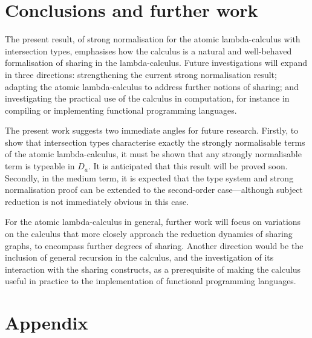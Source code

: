 \documentclass[orivec]{llncs}
\begin{document}
\section{Conclusions and further work}



The present result, of strong normalisation for the atomic lambda-calculus with intersection types, emphasises how the calculus is a natural and well-behaved formalisation of sharing in the lambda-calculus.
%
Future investigations will expand in three directions: strengthening the current strong normalisation result; adapting the atomic lambda-calculus to address further notions of sharing; and investigating the practical use of the calculus in computation, for instance in compiling or implementing functional programming languages.



The present work suggests two immediate angles for future research.
%
Firstly, to show that intersection types characterise exactly the strongly normalisable terms of the atomic lambda-calculus, it must be shown that any strongly normalisable term is typeable in $D_a$.
%
It is anticipated that this result will be proved soon.
%
Secondly, in the medium term, it is expected that the type system and strong normalisation proof can be extended to the second-order case---although subject reduction is not immediately obvious in this case.


For the atomic lambda-calculus in general, further work will focus on variations on the calculus that more closely approach the reduction dynamics of sharing graphs, to encompass further degrees of sharing.
%
Another direction would be the inclusion of general recursion in the calculus, and the investigation of its interaction with the sharing constructs, as a prerequisite of making the calculus useful in practice to the implementation of functional programming languages.






\newpage

\section*{Appendix}
\end{document}
